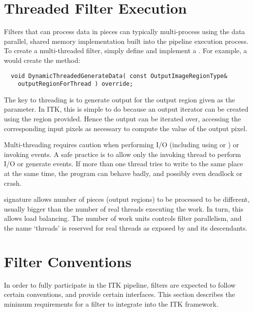\section{Threaded Filter Execution}
\label{sec:ThreadedFilterExecution}

Filters that can process data in pieces can typically multi-process
using the data parallel, shared memory implementation built into the
pipeline execution process. To create a multi-threaded filter, simply
define and implement a .
For example, a  would create the method:

\small
\begin{verbatim}
  void DynamicThreadedGenerateData( const OutputImageRegionType&
    outputRegionForThread ) override;
\end{verbatim}
\normalsize

The key to threading is to generate output for the output region given as
the parameter. In ITK, this is simple to do
because an output iterator can be created using the region provided. Hence
the output can be iterated over, accessing the corresponding input pixels as
necessary to compute the value of the output pixel.

Multi-threading requires caution when performing I/O (including using
 or ) or invoking events. A safe practice is to allow
only the invoking thread to perform I/O or generate events.
If more than one thread tries to write to the same place at the same time,
the program can behave badly, and possibly even deadlock or crash.

 signature allows number of pieces
(output regions) to be processed to be different, usually bigger than the
number of real threads executing the work. In turn, this allows load
balancing. The number of work units controls filter parallelism,
and the name `threads' is reserved for real threads as exposed by
 and its descendants.



\section{Filter Conventions}

In order to fully participate in the ITK pipeline, filters are expected to
follow certain conventions, and provide certain interfaces.  This section
describes the minimum requirements for a filter to integrate into the ITK
framework.

